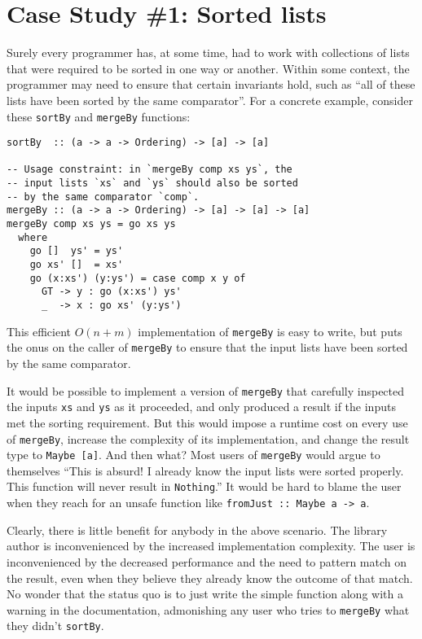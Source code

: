 \documentclass[format=sigplan, review=false, screen=true]{acmart}
\begin{document}
\section{Case Study \#1: Sorted lists}

Surely every programmer has, at some time, had to work with collections of
lists that were required to be sorted in one way or another. Within some
context, the programmer may need to ensure that certain invariants hold, such
as ``all of these lists have been sorted by the same comparator''. For a concrete
example, consider these \texttt{sortBy} and \texttt{mergeBy} functions:
\begin{verbatim}
sortBy  :: (a -> a -> Ordering) -> [a] -> [a]

-- Usage constraint: in `mergeBy comp xs ys`, the
-- input lists `xs` and `ys` should also be sorted
-- by the same comparator `comp`.
mergeBy :: (a -> a -> Ordering) -> [a] -> [a] -> [a]
mergeBy comp xs ys = go xs ys
  where
    go []  ys' = ys'
    go xs' []  = xs'
    go (x:xs') (y:ys') = case comp x y of
      GT -> y : go (x:xs') ys'
      _  -> x : go xs' (y:ys')
\end{verbatim}
This efficient $O(n+m)$ implementation of \texttt{mergeBy} is easy to write,
but puts the onus on the caller of \texttt{mergeBy} to ensure that the
input lists have been sorted by the same comparator.

It would be possible to implement a version of \texttt{mergeBy} that
carefully inspected the inputs \texttt{xs} and \texttt{ys} as it
proceeded, and only produced a result if the inputs met the sorting
requirement. But this would impose a runtime cost on every use of
\texttt{mergeBy}, increase the complexity of its implementation,
and change the result type to \texttt{Maybe [a]}. And then what?
Most users of \texttt{mergeBy} would argue to themselves ``This is
absurd! I already know the input lists were sorted properly. This
function will never result in \texttt{Nothing}.'' It would be hard
to blame the user when they reach for an  unsafe function like
\texttt{fromJust :: Maybe a -> a}.

Clearly, there is little benefit for anybody in the above scenario. The
library author is inconvenienced by the increased implementation complexity.
The user is inconvenienced by the decreased performance and the need to
pattern match on the result, even when they believe they already know the
outcome of that match. No wonder that the status quo is to just write
the simple function along with a warning in the documentation, admonishing
any user who tries to \texttt{mergeBy} what they didn't \texttt{sortBy}.
\end{document}
